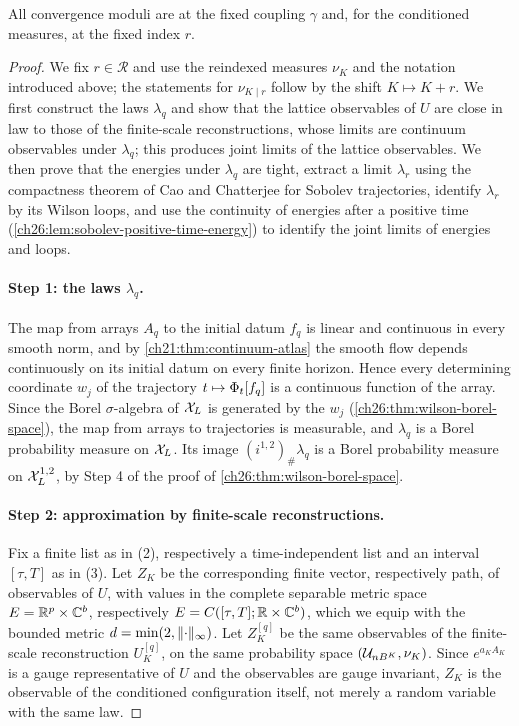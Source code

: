 All convergence moduli are at the fixed coupling $\gamma$ and, for the conditioned measures, at the fixed index $r$.

\begin{proof}
We fix $r\in\mathcal R$ and use the reindexed measures $\nu_K$ and the notation introduced above; the statements for $\nu_{K\mid r}$ follow by the shift $K\mapsto K+r$. We first construct the laws $\lambda_q$ and show that the lattice observables of $U$ are close in law to those of the finite-scale reconstructions, whose limits are continuum observables under $\lambda_q$; this produces joint limits of the lattice observables. We then prove that the energies under $\lambda_q$ are tight, extract a limit $\lambda_r$ using the compactness theorem of Cao and Chatterjee for Sobolev trajectories, identify $\lambda_r$ by its Wilson loops, and use the continuity of energies after a positive time (\cref{ch26:lem:sobolev-positive-time-energy}) to identify the joint limits of energies and loops.

\paragraph{Step 1: the laws $\lambda_q$.}
The map from arrays $A_q$ to the initial datum $f_q$ is linear and continuous in every smooth norm, and by \cref{ch21:thm:continuum-atlas} the smooth flow depends continuously on its initial datum on every finite horizon. Hence every determining coordinate $w_j$ of the trajectory $t\mapsto\Phi_t[f_q]$ is a continuous function of the array. Since the Borel $\sigma$-algebra of $\mathcal X_L$ is generated by the $w_j$ (\cref{ch26:thm:wilson-borel-space}), the map from arrays to trajectories is measurable, and $\lambda_q$ is a Borel probability measure on $\mathcal X_L$. Its image $(i^{1,2})_\#\lambda_q$ is a Borel probability measure on $\mathcal X_L^{1,2}$, by Step 4 of the proof of \cref{ch26:thm:wilson-borel-space}.

\paragraph{Step 2: approximation by finite-scale reconstructions.}
Fix a finite list as in (2), respectively a time-independent list and an interval $[\tau,T]$ as in (3). Let $Z_K$ be the corresponding finite vector, respectively path, of observables of $U$, with values in the complete separable metric space $E=\mathbb R^p\times\mathbb C^b$, respectively $E=C([\tau,T];\mathbb R\times\mathbb C^b)$, which we equip with the bounded metric $d=\min(2,\lVert \cdot\rVert_\infty)$. Let $Z_K^{[q]}$ be the same observables of the finite-scale reconstruction $U_K^{[q]}$, on the same probability space $(\mathcal U_{nB^K},\nu_K)$. Since $e^{a_KA_K}$ is a gauge representative of $U$ and the observables are gauge invariant, $Z_K$ is the observable of the conditioned configuration itself, not merely a random variable with the same law.


\end{proof}
